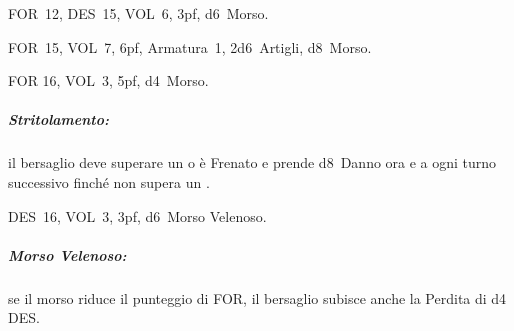 \documentclass[itdr]{subfiles}
\begin{document}
\vspace{2ex}

FOR~12, DES~15, VOL~6, 3pf, d6~Morso.

\vspace{2ex}

FOR~15, VOL~7, 6pf, Armatura~1, 2d6~Artigli, d8~Morso.

\vspace{2ex}

FOR 16, VOL~3, 5pf, d4~Morso.
\subparagraph{Stritolamento:} il bersaglio deve superare un  o è Frenato e prende d8~Danno ora e a ogni turno successivo finché non supera un .

\vspace{2ex}

DES~16, VOL~3, 3pf, d6~Morso Velenoso.
\subparagraph{Morso Velenoso:} se il morso riduce il punteggio di FOR, il bersaglio subisce anche la Perdita di d4 DES.

\vfill
\end{document}
